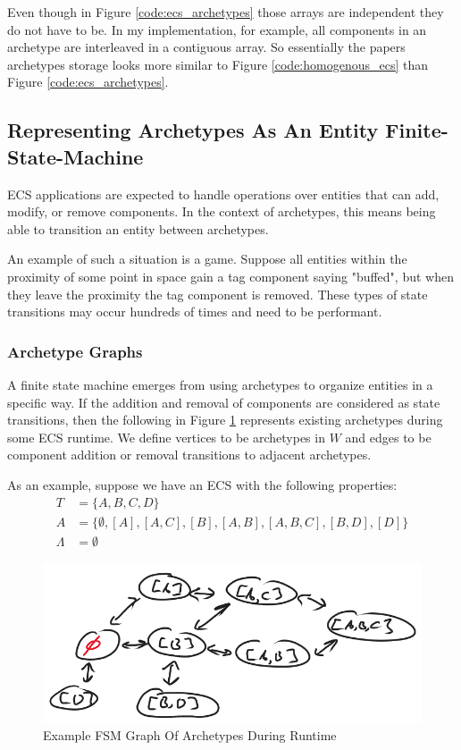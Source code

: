 Even though in Figure \ref{code:ecs_archetypes} those arrays are independent they do not have to be. In my implementation, for example, all components in an archetype are interleaved in a contiguous array. So essentially the papers archetypes storage looks more similar to Figure \ref{code:homogenous_ecs} than Figure \ref{code:ecs_archetypes}.

\subsection{Representing Archetypes As An Entity Finite-State-Machine}
\label{sec:fsm_arc}
ECS applications are expected to handle operations over entities that can add, modify, or remove components. In the context of archetypes, this means being able to transition an entity between archetypes. 

An example of such a situation is a game. Suppose all entities within the proximity of some point in space gain a tag component saying "buffed", but when they leave the proximity the tag component is removed. These types of state transitions may occur hundreds of times and need to be performant.

\subsubsection{Archetype Graphs}

A finite state machine emerges from using archetypes to organize entities in a specific way. If the addition and removal of components are considered as state transitions, then the following in Figure \ref{fig:graph1} represents existing archetypes during some ECS runtime. We define vertices to be archetypes in $W$ and edges to be component addition or removal transitions to adjacent archetypes.

As an example, suppose we have an ECS with the following properties:
\begin{align}
    T &= \{A,B,C,D\} \\
    A &= \{ \emptyset, [A] , [A,C] ,[B], [A,B], [A,B,C], [B,D], [D]\} \\
    \Lambda &= \emptyset
\end{align}

\begin{figure}[htbp]
    \centering
    \includegraphics[width=0.5\linewidth]{resources/graph1.png}
    \caption{Example FSM Graph Of Archetypes During Runtime}
    \label{fig:graph1}
\end{figure}

